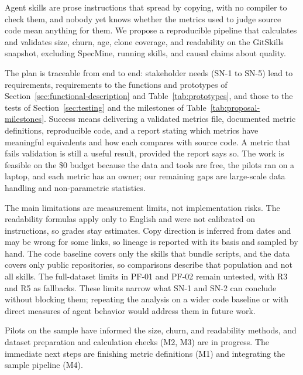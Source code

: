 \label{sec:conclusion}

Agent skills are prose instructions that spread by copying, with no compiler to check them, and nobody yet knows whether the metrics used to judge source code mean anything for them. We propose a reproducible pipeline that calculates and validates size, churn, age, clone coverage, and readability on the GitSkills snapshot, excluding SpecMine, running skills, and causal claims about quality.

The plan is traceable from end to end: stakeholder needs (SN-1 to SN-5) lead to requirements, requirements to the functions and prototypes of Section~\ref{sec:functional-description} and Table~\ref{tab:prototypes}, and those to the tests of Section~\ref{sec:testing} and the milestones of Table~\ref{tab:proposal-milestones}. Success means delivering a validated metrics file, documented metric definitions, reproducible code, and a report stating which metrics have meaningful equivalents and how each compares with source code. A metric that fails validation is still a useful result, provided the report says so. The work is feasible on the \$0 budget because the data and tools are free, the pilots ran on a laptop, and each metric has an owner; our remaining gaps are large-scale data handling and non-parametric statistics.

The main limitations are measurement limits, not implementation risks. The readability formulas apply only to English and were not calibrated on instructions, so grades stay estimates. Copy direction is inferred from dates and may be wrong for some links, so lineage is reported with its basis and sampled by hand. The code baseline covers only the skills that bundle scripts, and the data covers only public repositories, so comparisons describe that population and not all skills. The full-dataset limits in PF-01 and PF-02 remain untested, with R3 and R5 as fallbacks. These limits narrow what SN-1 and SN-2 can conclude without blocking them; repeating the analysis on a wider code baseline or with direct measures of agent behavior would address them in future work.

Pilots on the sample have informed the size, churn, and readability methods, and dataset preparation and calculation checks (M2, M3) are in progress. The immediate next steps are finishing metric definitions (M1) and integrating the sample pipeline (M4).
